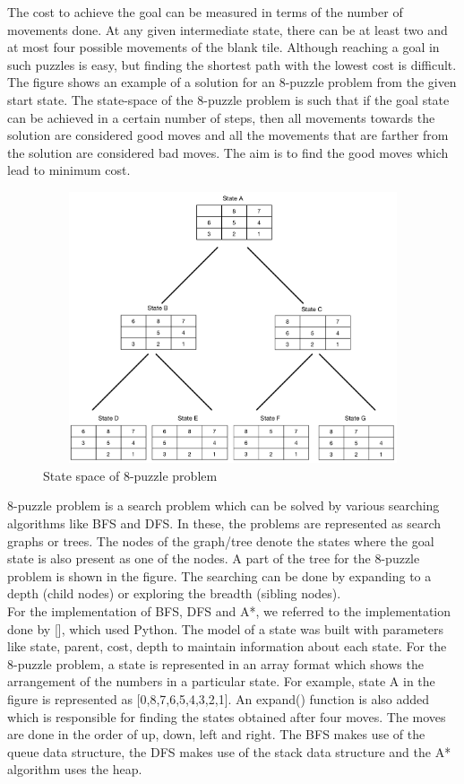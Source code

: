 \documentclass{svproc}
\begin{document}
The cost to achieve the goal can be measured in terms of the number of movements done. At any given intermediate state, there can be at least two and at most four possible movements of the blank tile. Although reaching a goal in such puzzles is easy, but finding the shortest path with the lowest cost is difficult. The figure shows an example of a solution for an 8-puzzle problem from the given start state. The state-space of the 8-puzzle problem is such that if the goal state can be achieved in a certain number of steps, then all movements towards the solution are considered good moves and all the movements that are farther from the solution are considered bad moves. The aim is to find the good moves which lead to minimum cost. 

\begin{figure}
	\centering
	\includegraphics[width=12cm,height=8cm,keepaspectratio]{ExampleState.png}
	\caption{State space of 8-puzzle problem}
	\label{fig:2}       %
\end{figure}

8-puzzle problem is a search problem which can be solved by various searching algorithms like BFS and DFS. In these, the problems are represented as search graphs or trees. The nodes of the graph/tree denote the states where the goal state is also present as one of the nodes. A part of the tree for the 8-puzzle problem is shown in the figure. The searching can be done by expanding to a depth (child nodes) or exploring the breadth (sibling nodes). \\
For the implementation of BFS, DFS and A*, we referred to the implementation done by [], which used Python. The model of a state was built with parameters like state, parent, cost, depth to maintain information about each state. For the 8-puzzle problem, a state is represented in an array format which shows the arrangement of the numbers in a particular state. For example, state A in the figure is represented as [0,8,7,6,5,4,3,2,1]. An expand() function is also added which is responsible for finding the states obtained after four moves. The moves are done in the order of up, down, left and right. The BFS makes use of the queue data structure, the DFS makes use of the stack data structure and the A* algorithm uses the heap. 
\end{document}
